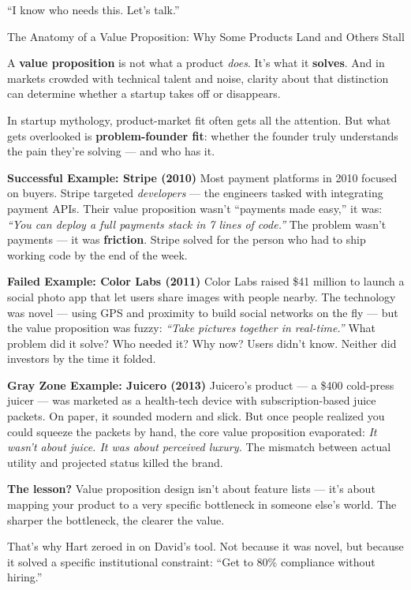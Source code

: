 ``I know who needs this. Let’s talk.''

\medskip

\begin{HistoricalSidebar}{The Anatomy of a Value Proposition: Why Some Products Land and Others Stall}

  A \textbf{value proposition} is not what a product \textit{does}. It's what it \textbf{solves}. And in markets 
  crowded with technical talent and noise, clarity about that distinction can determine whether a startup takes 
  off or disappears.
  
  \medskip
  
  In startup mythology, product-market fit often gets all the attention. But what gets overlooked is \textbf{problem-founder fit}: 
  whether the founder truly understands the pain they’re solving — and who has it.
  
  \medskip
  
  \textbf{Successful Example: Stripe (2010)}  
  Most payment platforms in 2010 focused on buyers. Stripe targeted \textit{developers} — the engineers tasked with integrating 
  payment APIs. Their value proposition wasn’t “payments made easy,” it was:  
  \textit{“You can deploy a full payments stack in 7 lines of code.”}  
  The problem wasn’t payments — it was \textbf{friction}. Stripe solved for the person who had to ship working code by the end 
  of the week.
  
  \medskip
  
  \textbf{Failed Example: Color Labs (2011)}  
  Color Labs raised \$41 million to launch a social photo app that let users share images with people nearby. The technology 
  was novel — using GPS and proximity to build social networks on the fly — but the value proposition was fuzzy:  
  \textit{“Take pictures together in real-time.”}  
  What problem did it solve? Who needed it? Why now? Users didn’t know. Neither did investors by the time it folded.
  
  \medskip
  
  \textbf{Gray Zone Example: Juicero (2013)}  
  Juicero’s product — a \$400 cold-press juicer — was marketed as a health-tech device with subscription-based juice packets. 
  On paper, it sounded modern and slick. But once people realized you could squeeze the packets by hand, the core value 
  proposition evaporated:  
  \textit{It wasn't about juice. It was about perceived luxury.}  
  The mismatch between actual utility and projected status killed the brand.
  
  \medskip
  
  \textbf{The lesson?}  
  Value proposition design isn’t about feature lists — it’s about mapping your product to a very specific bottleneck in someone 
  else’s world. The sharper the bottleneck, the clearer the value.
  
  \medskip
  
  That’s why Hart zeroed in on David’s tool. Not because it was novel, but because it solved a specific institutional constraint:  
  “Get to 80\% compliance without hiring.”
  
\end{HistoricalSidebar}


